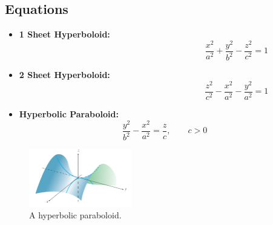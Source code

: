 \documentclass{article}
\begin{document}
\subsection{Equations}
\begin{itemize}
  \item \textbf{1 Sheet Hyperboloid:}
  \[
  \quad\qquad\qquad\qquad\qquad\qquad\qquad\qquad\qquad\frac{x^2}{a^2}+\frac{y^2}{b^2}-\frac{z^2}{c^2}=1
  \]
  \item \textbf{2 Sheet Hyperboloid:}
  \[
  \quad\qquad\qquad\qquad\qquad\qquad\qquad\qquad\qquad\frac{z^2}{c^2}-\frac{x^2}{a^2}-\frac{y^2}{a^2}=1
  \]
  \item \textbf{Hyperbolic Paraboloid:}
  \[
  \frac{y^2}{b^2}-\frac{x^2}{a^2}=\frac{z}{c},\qquad c>0
  \]
\end{itemize}
\begin{figure}[H]
  \includegraphics[width=0.4\textwidth, center]{hyperboloid4.png}
  \caption{A hyperbolic paraboloid.}
  \label{fig:hyperbola4}
\end{figure}
\end{document}
